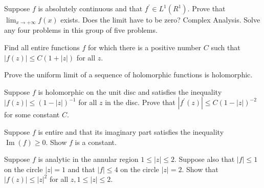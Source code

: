 \documentclass[14pt]{extarticle}
\begin{document}
Suppose $f$ is absolutely continuous and that $f^{\prime} \in L^{1}\left(R^{1}\right)$. Prove that $\lim _{x \rightarrow+\infty} f(x)$ exists. Does the limit have to be zero? Complex Analysis. Solve any four problems in this group of five problems.
\newpage

Find all entire functions $f$ for which there is a positive number $C$ such that $|f(z)| \leq C(1+|z|)$ for all $z$.
\newpage

Prove the uniform limit of a sequence of holomorphic functions is holomorphic.
\newpage

Suppose $f$ is holomorphic on the unit disc and satisfies the inequality $|f(z)| \leq(1-|z|)^{-1}$ for all $z$ in the disc. Prove that $\left|f^{\prime}(z)\right| \leq C(1-|z|)^{-2}$ for some constant $C$.
\newpage

Suppose $f$ is entire and that its imaginary part satisfies the inequality $\operatorname{Im}(f) \geq 0$. Show $f$ is a constant.
\newpage

Suppose $f$ is analytic in the annular region $1 \leq|z| \leq 2$. Suppose also that $|f| \leq 1$ on the circle $|z|=1$ and that $|f| \leq 4$ on the circle $|z|=2$. Show that $|f(z)| \leq|z|^{2}$ for all $z, 1 \leq|z| \leq 2$.
\newpage
\end{document}
